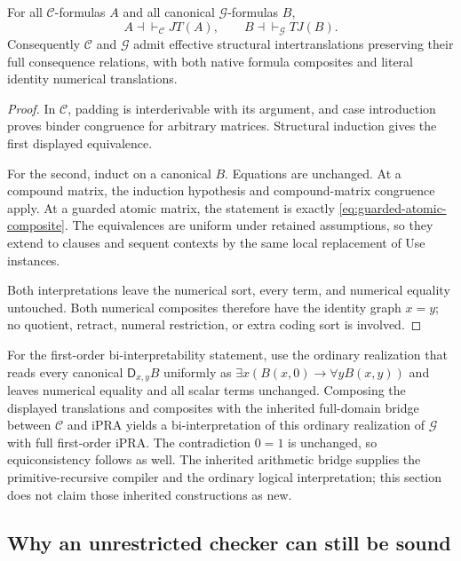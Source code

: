 \begin{theorem}
For all $\mathcal C$-formulas $A$ and all canonical
$\mathcal G$-formulas $B$,
\[
 A\dashv\vdash_{\mathcal C}JT(A),\qquad
 B\dashv\vdash_{\mathcal G}TJ(B).
\]
Consequently $\mathcal C$ and $\mathcal G$ admit effective structural
intertranslations preserving their full consequence relations, with
both native formula composites and literal identity numerical
translations.
\end{theorem}
\begin{proof}
In $\mathcal C$, padding is interderivable with its argument, and
case introduction proves binder congruence for arbitrary matrices.
Structural induction gives the first displayed equivalence.

For the second, induct on a canonical $B$.  Equations are unchanged.
At a compound matrix, the induction hypothesis and compound-matrix
congruence apply.  At a guarded atomic matrix, the statement is
exactly \eqref{eq:guarded-atomic-composite}.  The equivalences are
uniform under retained assumptions, so they extend to clauses and
sequent contexts by the same local replacement of Use instances.

Both interpretations leave the numerical sort, every term, and
numerical equality untouched.  Both numerical composites therefore
have the identity graph $x=y$; no quotient, retract, numeral restriction,
or extra coding sort is involved.
\end{proof}

For the first-order bi-interpretability statement, use the ordinary
realization that reads every canonical
$\mathsf D_{x,y}B$ uniformly as
$\exists x(B(x,0)\to\forall yB(x,y))$ and leaves numerical equality
and all scalar terms unchanged.  Composing the displayed translations
and composites with the inherited full-domain bridge between
$\mathcal C$ and iPRA yields a bi-interpretation of this ordinary
realization of $\mathcal G$ with full first-order iPRA.
The contradiction $0=1$ is
unchanged, so equiconsistency follows as well.  The inherited arithmetic
bridge supplies the primitive-recursive compiler and the ordinary
logical interpretation; this section does not claim those inherited
constructions as new.

\subsection{Why an unrestricted checker can still be sound}

